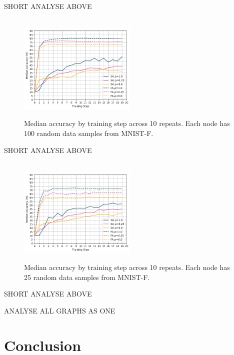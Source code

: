\documentclass[letterpaper, 10 pt, conference]{ieeeconf}  %
\begin{document}
SHORT ANALYSE ABOVE

\begin{figure}[H] 
	 \\
	\includegraphics[width=0.5\textwidth]{conf_sparse_ns100_cl3}
	\caption{Median accuracy by training step across 10 repeats. Each node has 100 random data samples from MNIST-F.}
	\label{aeg8}
\end{figure}

SHORT ANALYSE ABOVE

\begin{figure}[H] 
	 \\
	\includegraphics[width=0.5\textwidth]{conf_sparse_ns25_cl3}
	\caption{Median accuracy by training step across 10 repeats. Each node has 25 random data samples from MNIST-F.}
	\label{aeg9}
\end{figure}

SHORT ANALYSE ABOVE

ANALYSE ALL GRAPHS AS ONE

\section{Conclusion}

\addtolength{\textheight}{-12cm}   %
\end{document}

